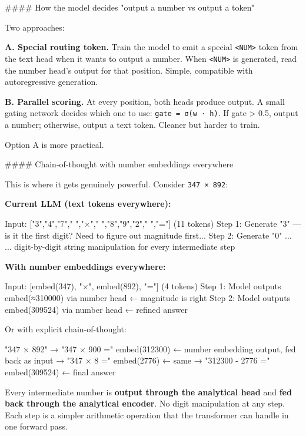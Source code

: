 \documentclass[11pt]{article}
\begin{document}
\#\#\#\# How the model decides "output a number vs output a token"


Two approaches:


\textbf{A. Special routing token.} Train the model to emit a special \texttt{<NUM>} token from the text head when it wants to output a number. When \texttt{<NUM>} is generated, read the number head's output for that position. Simple, compatible with autoregressive generation.


\textbf{B. Parallel scoring.} At every position, both heads produce output. A small gating network decides which one to use: \texttt{gate = σ(w · h)}. If gate > 0.5, output a number; otherwise, output a text token. Cleaner but harder to train.


Option A is more practical.


\#\#\#\# Chain-of-thought with number embeddings everywhere


This is where it gets genuinely powerful. Consider \texttt{347 × 892}:


\textbf{Current LLM (text tokens everywhere):}

\begin{CodeBlock}
Input:  ["3","4","7"," ","×"," ","8","9","2"," ","="]  (11 tokens)
Step 1: Generate "3" — is it the first digit? Need to figure out magnitude first...
Step 2: Generate "0" ...
... digit-by-digit string manipulation for every intermediate step
\end{CodeBlock}


\textbf{With number embeddings everywhere:}

\begin{CodeBlock}
Input:  [embed(347), "×", embed(892), "="]  (4 tokens)
Step 1: Model outputs embed(≈310000) via number head  ← magnitude is right
Step 2: Model outputs embed(309524) via number head   ← refined answer
\end{CodeBlock}


Or with explicit chain-of-thought:

\begin{CodeBlock}
"347 × 892"
→ "347 × 900 =" embed(312300)     ← number embedding output, fed back as input
→ "347 × 8 ="   embed(2776)       ← same
→ "312300 - 2776 =" embed(309524) ← final answer
\end{CodeBlock}


Every intermediate number is \textbf{output through the analytical head} and \textbf{fed back through the analytical encoder}. No digit manipulation at any step. Each step is a simpler arithmetic operation that the transformer can handle in one forward pass.
\end{document}
